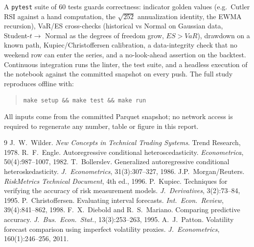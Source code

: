 \documentclass[11pt,a4paper]{article}
\begin{document}
A \texttt{pytest} suite of 60 tests guards correctness: indicator golden values (e.g.\ Cutler RSI against
a hand computation, the $\sqrt{252}$ annualization identity, the EWMA recursion), VaR/ES cross-checks
(historical vs Normal on Gaussian data, Student-$t \to$ Normal as the degrees of freedom grow, $ES>VaR$),
drawdown on a known path, Kupiec/Christoffersen calibration, a data-integrity check that no weekend row
can enter the series, and a no-look-ahead assertion on the backtest. Continuous integration runs the
linter, the test suite, and a headless execution of the notebook against the committed snapshot on every
push. The full study reproduces offline with:
\begin{quote}\texttt{make setup \&\& make test \&\& make run}\end{quote}
All inputs come from the committed Parquet snapshot; no network access is required to regenerate any
number, table or figure in this report.
\begin{thebibliography}{9}
 J.~W.~Wilder. \emph{New Concepts in Technical Trading Systems}. Trend Research, 1978.
 R.~F.~Engle. Autoregressive conditional heteroscedasticity. \emph{Econometrica}, 50(4):987--1007, 1982.
 T.~Bollerslev. Generalized autoregressive conditional heteroskedasticity. \emph{J.~Econometrics}, 31(3):307--327, 1986.
 J.P.~Morgan/Reuters. \emph{RiskMetrics Technical Document}, 4th ed., 1996.
 P.~Kupiec. Techniques for verifying the accuracy of risk measurement models. \emph{J.~Derivatives}, 3(2):73--84, 1995.
 P.~Christoffersen. Evaluating interval forecasts. \emph{Int.~Econ.~Review}, 39(4):841--862, 1998.
 F.~X.~Diebold and R.~S.~Mariano. Comparing predictive accuracy. \emph{J.~Bus.~Econ.~Stat.}, 13(3):253--263, 1995.
 A.~J.~Patton. Volatility forecast comparison using imperfect volatility proxies. \emph{J.~Econometrics}, 160(1):246--256, 2011.
\end{thebibliography}
\end{document}

